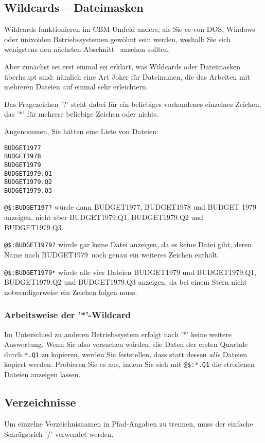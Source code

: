 \documentclass[10pt,a4paper]{scrartcl}		%
\begin{document}
\subsection{Wildcards -- Dateimasken}
Wildcards funktionieren im CBM-Umfeld anders, als Sie es von DOS,
Windows oder unixoiden Betriebssystemen gewöhnt sein werden, weshalb 
Sie sich wenigstens den nächsten Abschnitt \glqq {}\grqq\ 
ansehen sollten.

Aber zunächst sei erst einmal sei erklärt, was Wildcards oder Dateimasken 
überhaupt sind: nämlich
eine Art Joker für Dateinamen, die das Arbeiten mit mehreren Dateien
auf einmal sehr erleichtern.

Das Fragezeichen '?' steht dabei für ein beliebiges vorhandenes einzelnes 
Zeichen, das '*' für mehrere beliebige Zeichen oder nichts.

Angenommen, Sie hätten eine Liste von Dateien:

\begin{verbatim}
BUDGET1977
BUDGET1978
BUDGET1979
BUDGET1979.Q1
BUDGET1979.Q2
BUDGET1979.Q3
\end{verbatim}

\texttt{@\$:BUDGET197?} würde dann BUDGET1977, BUDGET1978 und BUDGET 1979
anzeigen, nicht aber BUDGET1979.Q1, BUDGET1979.Q2 und BUDGET1979.Q3.

\texttt{@\$:BUDGET1979?} würde gar keine Datei anzeigen, da es keine
Datei gibt, deren Name nach \glqq BUDGET1979\grqq\ noch genau ein
weiteres Zeichen enthält.

\texttt{@\$:BUDGET1979*} würde alle vier Dateien BUDGET1979 und 
BUDGET1979.Q1, BUDGET1979.Q2 und BUDGET1979.Q3 anzeigen, da bei
einem Stern nicht notwendigerweise ein Zeichen folgen muss.

\subsubsection*{Arbeitsweise der '*'-Wildcard}
\label{starwc}
Im Unterschied zu anderen Betriebssystem erfolgt nach '*' keine
weitere Auswertung. Wenn Sie also versuchen würden, die Daten
der ersten Quartale durch \texttt{*.Q1} zu kopieren, werden Sie
feststellen, dass statt dessen \textit{alle} Dateien kopiert werden.
Probieren Sie es aus, indem Sie sich mit \texttt{@\$:*.Q1} die
etroffenen Dateien anzeigen lassen.

\subsection{Verzeichnisse}
Um einzelne Verzeichnisnamen in Pfad-Angaben zu trennen, muss der
einfache Schrägstrich '/' verwendet werden.
\end{document}
